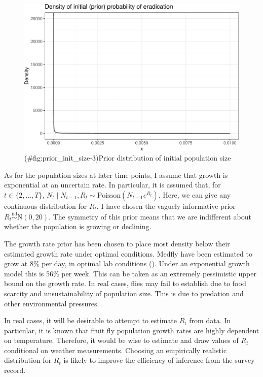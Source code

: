 \documentclass[
]{book}
\begin{document}
\begin{figure}
\centering
\includegraphics{_main_files/figure-latex/prior_init_size-3.pdf}
\caption{(\#fig:prior\_init\_size-3)Prior distribution of initial population size}
\end{figure}

As for the population sizes at later time points, I assume that growth is exponential at an uncertain rate. In particular, it is assumed that, for \(t \in \{2, \ldots, T\}\), \(N_t \mid N_{t-1}, R_t \sim \mathrm{Poisson}(N_{t-1} e^{R_t})\). Here, we can give any continuous distribution for \(R_t\). I have chosen the vaguely informative prior \(R_t \stackrel{\text{iid}} \sim \mathrm N(0, 20)\). The symmetry of this prior means that we are indifferent about whether the population is growing or declining.

The growth rate prior has been chosen to place most density below their estimated growth rate under optimal conditions. Medfly have been estimated to grow at 8\% per day, in optimal lab conditions (\citet{papadopoulos2002}). Under an exponential growth model this is 56\% per week. This can be taken as an extremely pessimistic upper bound on the growth rate. In real cases, flies may fail to establish due to food scarcity and unsustainability of population size. This is due to predation and other environmental pressures.

In real cases, it will be desirable to attempt to estimate \(R_t\) from data. In particular, it is known that fruit fly population growth rates are highly dependent on temperature. Therefore, it would be wise to estimate and draw values of \(R_t\) conditional on weather measurements. Choosing an empirically realistic distribution for \(R_t\) is likely to improve the efficiency of inference from the survey record.
\end{document}
